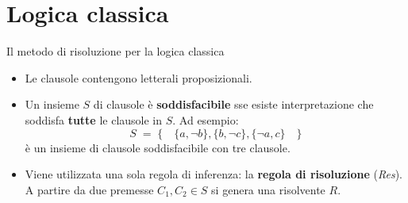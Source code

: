 \documentclass{beamer}
\begin{document}
\section{Logica classica}
\begin{frame}{Il metodo di risoluzione per la logica classica}
    \begin{itemize}
        \item Le clausole contengono letterali proposizionali.
        \vspace{10px}
        \item Un insieme $S$ di clausole è \textbf{soddisfacibile} sse esiste interpretazione che soddisfa \textbf{tutte} le clausole in $S$.
        Ad esempio:
        \[S \; = \; \{ \quad \{a, \lnot b\}, \{b, \lnot c\}, \{\lnot a, c\} \quad \}\]
        è un insieme di clausole soddisfacibile con tre clausole.
        \vspace{10px}
        \item Viene utilizzata una sola regola di inferenza: la \textbf{regola di risoluzione} (\emph{Res}). A partire da due premesse $C_1, C_2 \in S$ si genera una risolvente $R$.
    \end{itemize}
\end{frame}
\end{document}
